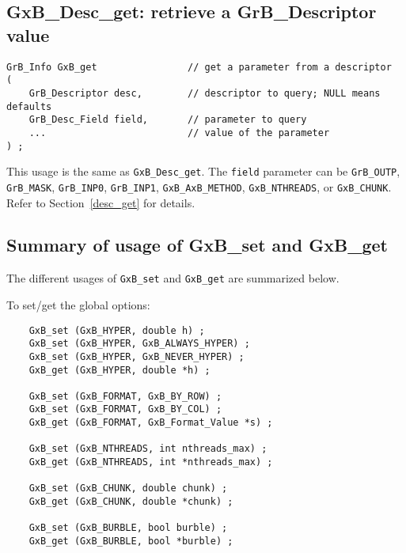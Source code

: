 \documentclass[12pt]{article}
\begin{document}
\subsection{{\sf GxB\_Desc\_get:} retrieve a {\sf GrB\_Descriptor} value}

\begin{mdframed}[userdefinedwidth=6in]
{\footnotesize
\begin{verbatim}
GrB_Info GxB_get                // get a parameter from a descriptor
(
    GrB_Descriptor desc,        // descriptor to query; NULL means defaults
    GrB_Desc_Field field,       // parameter to query
    ...                         // value of the parameter
) ;
\end{verbatim} } \end{mdframed}

This usage is the same as \verb'GxB_Desc_get'.  The \verb'field' parameter can
be \verb'GrB_OUTP', \verb'GrB_MASK', \verb'GrB_INP0', \verb'GrB_INP1',
\verb'GxB_AxB_METHOD',
\verb'GxB_NTHREADS', or \verb'GxB_CHUNK'.
Refer to Section~\ref{desc_get} for details.

\newpage
\subsection{Summary of usage of {\sf GxB\_set} and {\sf GxB\_get}}

The different usages of \verb'GxB_set' and \verb'GxB_get' are summarized below.

\noindent
To set/get the global options:

    {\footnotesize
    \begin{verbatim}
    GxB_set (GxB_HYPER, double h) ;
    GxB_set (GxB_HYPER, GxB_ALWAYS_HYPER) ;
    GxB_set (GxB_HYPER, GxB_NEVER_HYPER) ;
    GxB_get (GxB_HYPER, double *h) ;

    GxB_set (GxB_FORMAT, GxB_BY_ROW) ;
    GxB_set (GxB_FORMAT, GxB_BY_COL) ;
    GxB_get (GxB_FORMAT, GxB_Format_Value *s) ;

    GxB_set (GxB_NTHREADS, int nthreads_max) ;
    GxB_get (GxB_NTHREADS, int *nthreads_max) ;

    GxB_set (GxB_CHUNK, double chunk) ;
    GxB_get (GxB_CHUNK, double *chunk) ;

    GxB_set (GxB_BURBLE, bool burble) ;
    GxB_get (GxB_BURBLE, bool *burble) ; \end{verbatim} }
\end{document}
